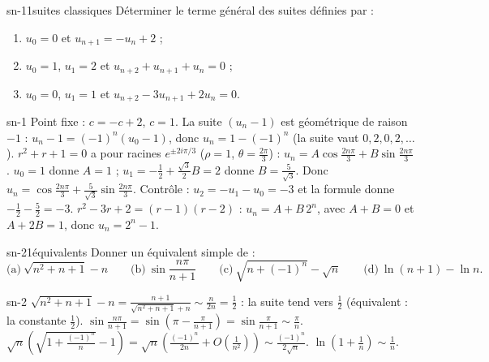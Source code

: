 
\begin{exo}{sn-1}{1}{suites classiques}
Déterminer le terme général des suites définies par :
\begin{enumerate}
\item $u_0=0$ et $u_{n+1}=-u_n+2$ ;
\item $u_0=1$, $u_1=2$ et $u_{n+2}+u_{n+1}+u_n=0$ ;
\item $u_0=0$, $u_1=1$ et $u_{n+2}-3u_{n+1}+2u_n=0$.
\end{enumerate}
\end{exo}

\begin{corrige}{sn-1}
 Point fixe : $c=-c+2$, $c=1$. La suite $(u_n-1)$ est géométrique de raison $-1$ : $u_n-1=(-1)^n(u_0-1)$, donc
$u_n=1-(-1)^n$ (la suite vaut $0,2,0,2,\dots$).
 $r^2+r+1=0$ a pour racines $e^{\pm2i\pi/3}$ ($\rho=1$, $\theta=\frac{2\pi}3$) : $u_n=A\cos\frac{2n\pi}3+B\sin\frac{2n\pi}3$.
$u_0=1$ donne $A=1$ ; $u_1=-\frac12+\frac{\sqrt3}2B=2$ donne $B=\frac5{\sqrt3}$. Donc $u_n=\cos\frac{2n\pi}3+\frac{5}{\sqrt3}\sin\frac{2n\pi}3$.
Contrôle : $u_2=-u_1-u_0=-3$ et la formule donne $-\frac12-\frac52=-3$.
 $r^2-3r+2=(r-1)(r-2)$ : $u_n=A+B\,2^n$, avec $A+B=0$ et $A+2B=1$, donc $u_n=2^n-1$.
\end{corrige}

\begin{exo}{sn-2}{1}{équivalents}
Donner un équivalent simple de :
\[\text{(a)}\ \sqrt{n^2+n+1}-n\qquad\text{(b)}\ \sin\frac{n\pi}{n+1}\qquad\text{(c)}\ \sqrt{n+(-1)^n}-\sqrt n\qquad\text{(d)}\ \ln(n+1)-\ln n.\]
\end{exo}

\begin{corrige}{sn-2}
 $\sqrt{n^2+n+1}-n=\frac{n+1}{\sqrt{n^2+n+1}+n}\sim\frac n{2n}=\frac12$ : la suite tend vers $\frac12$ (équivalent : la constante $\frac12$).
 $\sin\frac{n\pi}{n+1}=\sin\left(\pi-\frac\pi{n+1}\right)=\sin\frac\pi{n+1}\sim\frac\pi n$.
 $\sqrt n\left(\sqrt{1+\frac{(-1)^n}n}-1\right)=\sqrt n\left(\frac{(-1)^n}{2n}+O\left(\frac1{n^2}\right)\right)\sim\frac{(-1)^n}{2\sqrt n}$.
 $\ln\left(1+\frac1n\right)\sim\frac1n$.
\end{corrige}

